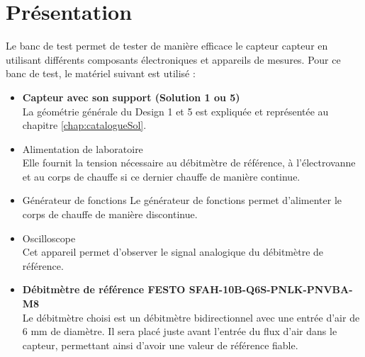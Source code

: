\section{Présentation}
Le banc de test permet de tester de manière efficace le capteur \gls{capteur} en utilisant différents composants électroniques et appareils de 
mesures. Pour ce banc de test, le matériel suivant est utilisé :
\begin{itemize}
    \item \textbf{Capteur avec son support (Solution 1 ou 5)}\\
          La géométrie générale du Design 1 et 5 est expliquée et représentée au chapitre \ref*{chap:catalogueSol}. \\
          
    \item Alimentation de laboratoire\\
          Elle fournit la tension nécessaire au débitmètre de référence, à l'électrovanne et au corps de chauffe si ce dernier chauffe de manière 
          continue. \\
          
    \item Générateur de fonctions
          Le générateur de fonctions permet d'alimenter le corps de chauffe de manière discontinue. \\
          
    \item Oscilloscope\\
          Cet appareil permet d'observer le signal analogique du débitmètre de référence. \\
          
    \item \textbf{Débitmètre de référence FESTO SFAH-10B-Q6S-PNLK-PNVBA-M8}\\
          Le débitmètre choisi est un débitmètre bidirectionnel avec une entrée d'air de 6 mm de diamètre. Il sera placé juste avant l'entrée du flux
          d'air dans le capteur, permettant ainsi d'avoir une valeur de référence fiable.\\
          

\end{itemize}
